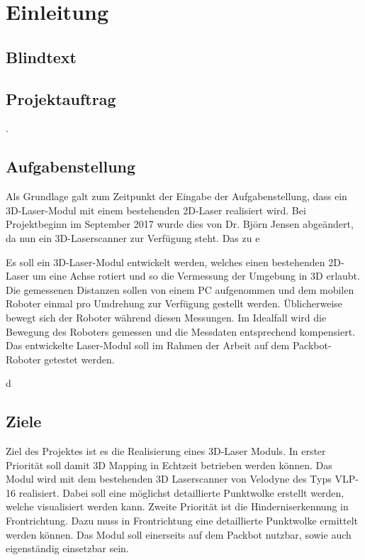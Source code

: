 \chapter{Einleitung}
\label{Einleitung}

\section{Blindtext} 
\blinditemize

\section {Projektauftrag}
\label{Projektauftrag}
.

\section{Aufgabenstellung}
\label{Aufgabenstellung}
Als Grundlage galt zum Zeitpunkt der Eingabe der Aufgabenstellung, dass ein 3D-Laser-Modul mit einem bestehenden 2D-Laser realisiert wird. Bei Projektbeginn im September 2017 wurde dies von Dr. Björn Jensen abgeändert, da nun ein 3D-Laserscanner zur Verfügung steht. Das zu e


Es soll ein 3D-Laser-Modul entwickelt werden, welches einen bestehenden 2D-Laser um eine Achse
rotiert und so die Vermessung der Umgebung in 3D erlaubt. Die gemessenen Distanzen sollen
von einem PC aufgenommen und dem mobilen Roboter einmal pro Umdrehung zur Verfügung gestellt
werden.
Üblicherweise bewegt sich der Roboter während diesen Messungen. Im Idealfall wird die Bewegung
des Roboters gemessen und die Messdaten entsprechend kompensiert.
Das entwickelte Laser-Modul soll im Rahmen der Arbeit auf dem Packbot-Roboter getestet werden.

d


\section{Ziele}
\label{Ziele}
Ziel des Projektes ist es die Realisierung eines 3D-Laser Moduls. In erster Priorität soll damit 3D Mapping in Echtzeit betrieben werden können. Das Modul wird mit dem bestehenden 3D Laserscanner von Velodyne des Typs VLP-16 realisiert. Dabei soll eine möglichst detaillierte Punktwolke erstellt werden, welche visualisiert werden kann. Zweite Priorität ist die Hinderniserkennung in Frontrichtung. Dazu muss in Frontrichtung eine detaillierte Punktwolke ermittelt werden können. Das Modul soll einerseits auf dem Packbot nutzbar, sowie auch eigenständig einsetzbar sein.